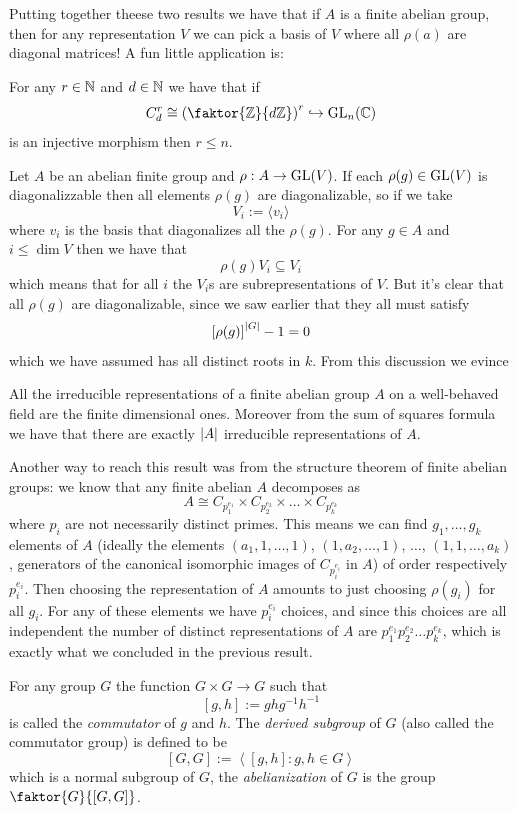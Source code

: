 \documentclass[11pt]{scrartcl}
\begin{document}
	Putting together theese two results we have that if $A$ is a finite abelian group, then for any representation $V$ we can pick a basis of $V$ where all $\rho(a)$ are diagonal matrices! A fun little application is:
	\begin{corollary}
		For any $r\in\mathbb N$ and $d\in \mathbb N$ we have that if
		$$C_d^r\cong \left(\faktor{\ZZ}{d\ZZ}\right)^r \hookrightarrow \GL_n(\CC)$$
		is an injective morphism then $r\le n$.
	\end{corollary}
	Let $A$ be an abelian finite group and $\rho:A\to \operatorname{GL}(V)$. If each $\rho(g)\in \operatorname{GL}(V)$ is diagonalizzable then all elements $\rho(g)$ are diagonalizable, so if we take 
	$$V_i:=\langle v_i \rangle$$
	where $v_i$ is the basis that diagonalizes all the $\rho(g)$. For any $g\in A$ and $i\le \dim V$ then we have that
	$$\rho(g)V_i \subseteq V_i$$
	which means that for all $i$ the $V_i$s are subrepresentations of $V$. But it's clear that all $\rho(g)$ are diagonalizable, since we saw earlier that they all must satisfy
	$$\left[\rho(g)\right]^{\left\lvert G \right\rvert}-1=0$$
	which we have assumed has all distinct roots in $k$.
	From this discussion we evince
	\begin{proposition}
		All the irreducible representations of a finite abelian group $A$ on a well-behaved field are the finite dimensional ones. Moreover from the sum of squares formula we have that there are exactly $\left\lvert A \right\rvert$ irreducible representations of $A$.
	\end{proposition}
	Another way to reach this result was from the structure theorem of finite abelian groups: we know that any finite abelian $A$ decomposes as
	$$A\cong C_{p_1^{e_1}}\times C_{p_2^{e_2}}\times \dots \times C_{p_k^{e_k}}$$
	where $p_i$ are not necessarily distinct primes. This means we can find $g_1,\dots,g_k$ elements of $A$ (ideally the elements $(a_1,1,\dots,1)$, $(1,a_2,\dots,1)$, $\dots$, $(1,1,\dots,a_k)$, generators of the canonical isomorphic images of $C_{p_i^{e_i}}$ in $A$) of order respectively $p_i^{e_i}$. Then choosing the representation of $A$ amounts to just choosing $\rho(g_i)$ for all $g_i$. For any of these elements we have $p_i^{e_i}$ choices, and since this choices are all independent the number of distinct representations of $A$ are $p_1^{e_1}p_2^{e_2}\dots p_k^{e_k}$, which is exactly what we concluded in the previous result. 
	\begin{definition}[Commutator]
		For any group $G$ the function $G\times G\to G$ such that
		$$[g,h]:=ghg^{-1}h^{-1}$$
		is called the \textit{commutator} of $g$ and $h$. The \textit{derived subgroup} of $G$ (also called the commutator group) is defined to be
		$$[G,G]:=\left\langle[g,h]:g,h\in G\right\rangle$$
		which is a normal subgroup of $G$, the \textit{abelianization} of $G$ is the group $\faktor{G}{[G,G]}$.
	\end{definition}
\end{document}
